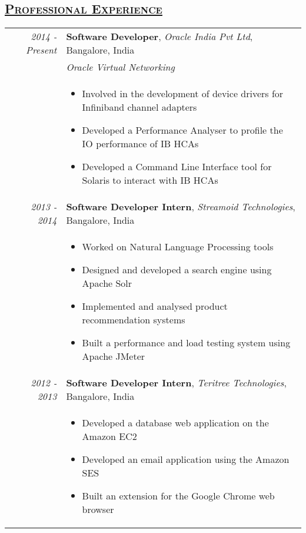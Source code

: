 \documentclass[14pt]{article}
\begin{document}
\subsection* {\scshape\LARGE\uline {Professional Experience}}
\large
\begin{tabularx}{\textwidth}{r X}
\emph{2014 - Present} & \textbf{Software Developer}, \textit{Oracle India Pvt Ltd}, Bangalore, India \\
		                      & \emph{Oracle Virtual Networking}\\ 
						& \begin{itemize}[noitemsep,topsep=0pt]
			                   \item Involved in the development of device drivers for Infiniband channel adapters
			                   \item Developed a Performance Analyser to profile the IO performance of IB HCAs
			                   \item Developed a Command Line Interface tool for Solaris to interact with IB HCAs
						   \end{itemize}	    
\\ 

\emph{2013 - 2014} & \textbf{Software Developer Intern}, \textit{Streamoid Technologies}, Bangalore, India \\ 
			            & \begin{itemize}[noitemsep,topsep=0pt]
						\item Worked on Natural Language Processing tools 
		 	            	\item Designed and developed a search engine using Apache Solr 
   			           	\item Implemented and analysed product recommendation systems 
			           	\item Built a performance and load testing system using Apache JMeter
					      \end{itemize}
\\ 

\emph{2012 - 2013} & \textbf{Software Developer Intern}, \textit{Teritree Technologies}, Bangalore, India \\ 
			            & \begin{itemize}[noitemsep,topsep=0pt]
						\item Developed a database web application on the Amazon EC2 
			            	\item Developed an email application using the Amazon SES
			            	\item Built an extension for the Google Chrome web browser	    
						\end{itemize}
\end{tabularx}
\end{document}
